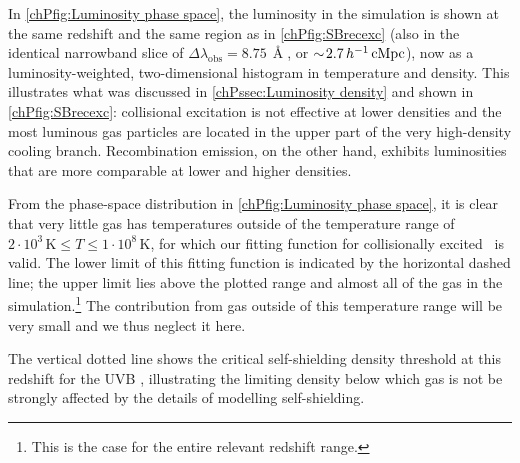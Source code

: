 In \cref{chPfig:Luminosity phase space}, the luminosity in the simulation is shown at the same redshift and the same region as in \cref{chPfig:SBrecexc} (also in the identical narrowband slice of $\Delta \lambda_\text{obs} = 8.75 \, \Angstrom$, or $\sim \! 2.7 \, h^{-1} \, \mathrm{cMpc}$), now as a luminosity-weighted, two-dimensional histogram in temperature and density. This illustrates what was discussed in \cref{chPssec:Luminosity density} and shown in \cref{chPfig:SBrecexc}: collisional excitation is not effective at lower densities and the most luminous gas particles are located in the upper part of the very high-density cooling branch. Recombination emission, on the other hand, exhibits luminosities that are more comparable at lower and higher densities.

From the phase-space distribution in \cref{chPfig:Luminosity phase space}, it is clear that very little gas has temperatures outside of the temperature range of $2 \cdot 10^3 \, \mathrm{K} \leq T \leq 1 \cdot 10^8 \, \mathrm{K}$, for which our fitting function for collisionally excited \lya\ is valid. The lower limit of this fitting function is indicated by the horizontal dashed line; the upper limit lies above the plotted range and almost all of the gas in the simulation.\footnote{This is the case for the entire relevant redshift range.} The contribution from gas outside of this temperature range will be very small and we thus neglect it here.

The vertical dotted line shows the critical self-shielding density threshold at this redshift for the  UVB \citep[from equation (13) in][]{2013MNRAS.430.2427R}, illustrating the limiting density below which gas is not be strongly affected by the details of modelling self-shielding. 

